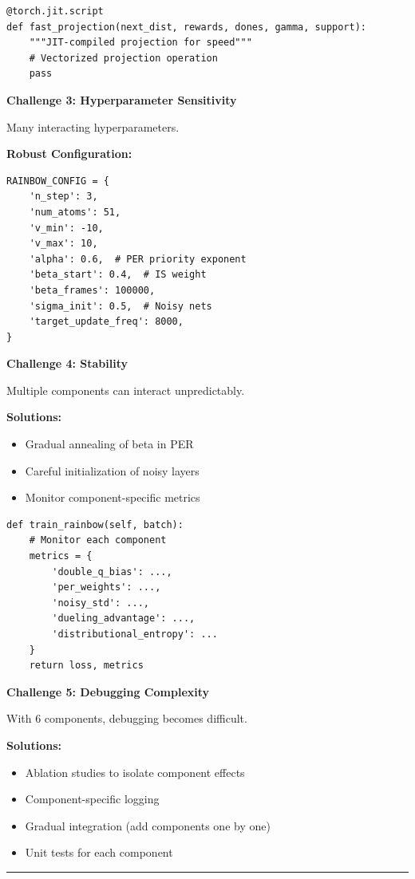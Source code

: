 \documentclass[12pt]{article}
\begin{document}
{{\begin{verbatim}
@torch.jit.script
def fast_projection(next_dist, rewards, dones, gamma, support):
    """JIT-compiled projection for speed"""
    # Vectorized projection operation
    pass
\end{verbatim}

\textbf{Challenge 3: Hyperparameter Sensitivity}

Many interacting hyperparameters.

\textbf{Robust Configuration:}
\begin{verbatim}
RAINBOW_CONFIG = {
    'n_step': 3,
    'num_atoms': 51,
    'v_min': -10,
    'v_max': 10,
    'alpha': 0.6,  # PER priority exponent
    'beta_start': 0.4,  # IS weight
    'beta_frames': 100000,
    'sigma_init': 0.5,  # Noisy nets
    'target_update_freq': 8000,
}
\end{verbatim}

\textbf{Challenge 4: Stability}

Multiple components can interact unpredictably.

\textbf{Solutions:}
\begin{itemize}
\item Gradual annealing of beta in PER
\item Careful initialization of noisy layers
\item Monitor component-specific metrics
\end{itemize}

\begin{verbatim}
def train_rainbow(self, batch):
    # Monitor each component
    metrics = {
        'double_q_bias': ...,
        'per_weights': ...,
        'noisy_std': ...,
        'dueling_advantage': ...,
        'distributional_entropy': ...
    }
    return loss, metrics
\end{verbatim}

\textbf{Challenge 5: Debugging Complexity}

With 6 components, debugging becomes difficult.

\textbf{Solutions:}
\begin{itemize}
\item Ablation studies to isolate component effects
\item Component-specific logging
\item Gradual integration (add components one by one)
\item Unit tests for each component
\end{itemize}

\noindent\rule{\textwidth}{0.2pt}
}}
\end{document}
